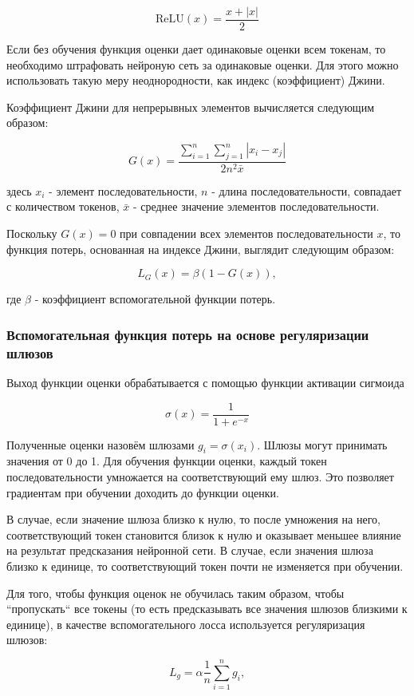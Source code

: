 \documentclass[times,specification,annotation]{itmo-student-thesis}
\begin{document}
$$
\text{ReLU}(x) = \dfrac{x + |x|}{2}
$$

Если без обучения функция оценки дает одинаковые оценки всем токенам, то необходимо штрафовать нейроную сеть за одинаковые оценки. Для этого можно использовать такую меру неоднородности, как индекс (коэффициент) Джини.

Коэффициент Джини для непрерывных элементов вычисляется следующим образом:

$$
G(x) = \dfrac{\sum\limits_{i=1}^n\sum\limits_{j=1}^n|x_i - x_j|}{2n^2\bar x}
$$

здесь $x_i$ - элемент последовательности, $n$ - длина последовательности, совпадает с количеством токенов, $\bar x$ - среднее значение элементов последовательности.

Поскольку $G(x) = 0$ при совпадении всех элементов последовательности $x$, то функция потерь, основанная на индексе Джини, выглядит следующим образом:

$$
L_G(x) = \beta(1 - G(x)),
$$

где $\beta$ - коэффициент вспомогательной функции потерь.

\subsubsection{Вспомогательная функция потерь на основе регуляризации шлюзов}

Выход функции оценки обрабатывается с помощью функции активации сигмоида

$$
\sigma(x) = \dfrac{1}{1 + e^{-x}}
$$

Полученные оценки назовём шлюзами $g_i = \sigma(x_i)$. Шлюзы могут принимать значения от 0 до 1. Для обучения функции оценки, каждый токен последовательности умножается на соответствующий ему шлюз. Это позволяет градиентам при обучении доходить до функции оценки. 

В случае, если значение шлюза близко к нулю, то после умножения на него, соответствующий токен становится близок к нулю и оказывает меньшее влияние на результат предсказания нейронной сети. В случае, если значения шлюза близко к единице, то соответствующий токен почти не изменяется при обучении.

Для того, чтобы функция оценок не обучилась таким образом, чтобы ``пропускать`` все токены (то есть предсказывать все значения шлюзов близкими к единице), в качестве вспомогательного лосса используется регуляризация шлюзов:

$$
L_g = \alpha \dfrac{1}{n}\sum_{i=1}^n g_i,
$$
\end{document}
